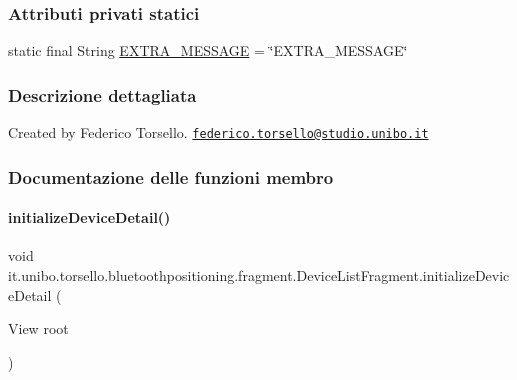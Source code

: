 \subsubsection*{Attributi privati statici}
\begin{DoxyCompactItemize}
\item 
static final String \hyperlink{classit_1_1unibo_1_1torsello_1_1bluetoothpositioning_1_1fragment_1_1DeviceListFragment_a6124d6f80d72149642440bb5910c2a53_a6124d6f80d72149642440bb5910c2a53}{E\+X\+T\+R\+A\+\_\+\+M\+E\+S\+S\+A\+GE} = \char`\"{}E\+X\+T\+R\+A\+\_\+\+M\+E\+S\+S\+A\+GE\char`\"{}
\end{DoxyCompactItemize}


\subsubsection{Descrizione dettagliata}
Created by Federico Torsello. \href{mailto:federico.torsello@studio.unibo.it}{\tt federico.\+torsello@studio.\+unibo.\+it} 

\subsubsection{Documentazione delle funzioni membro}
\hypertarget{classit_1_1unibo_1_1torsello_1_1bluetoothpositioning_1_1fragment_1_1DeviceListFragment_aafeba576519b4e419c2d5274d5a65133_aafeba576519b4e419c2d5274d5a65133}{}\label{classit_1_1unibo_1_1torsello_1_1bluetoothpositioning_1_1fragment_1_1DeviceListFragment_aafeba576519b4e419c2d5274d5a65133_aafeba576519b4e419c2d5274d5a65133} 
\paragraph{\texorpdfstring{initialize\+Device\+Detail()}{initializeDeviceDetail()}}
{\footnotesize\ttfamily void it.\+unibo.\+torsello.\+bluetoothpositioning.\+fragment.\+Device\+List\+Fragment.\+initialize\+Device\+Detail (\begin{DoxyParamCaption}\item[{View}]{root }\end{DoxyParamCaption})\hspace{0.3cm}{\ttfamily [private]}}


